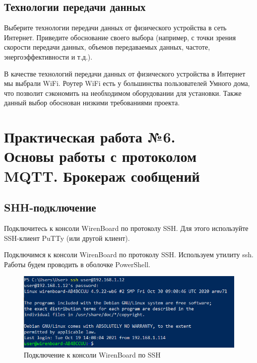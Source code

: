 \documentclass[a4paper,14pt]{extarticle}
\begin{document}
	\subsection{Технологии передачи данных}
	
	\begin{problem}
		Выберите технологии передачи данных от физического устройства в сеть
		Интернет. Приведите обоснование своего выбора (например, с точки зрения скорости
		передачи данных, объемов передаваемых данных, частоте, энергоэффективности и т.д.).
		
		\nonum 
		В качестве технологий передачи данных от физического устройства в Интернет мы выбрали WiFi. Роутер WiFi есть у большинства пользователей Умного дома, что позволит сэкономить на необходимом оборудовании для установки. Также данный выбор обоснован низкими требованиями проекта. 
	\end{problem}
	
	\newpage
\section{Практическая работа №6.\\ Основы работы с протоколом MQTT. Брокераж сообщений }

\subsection{SHH-подключение}

\begin{problem}
	Подключитесь к консоли WirenBoard по протоколу SSH. Для этого используйте SSH-клиент
	PuTTy (или другой клиент).
	
	\nonum 
	
	Подключимся к консоли WirenBoard по протоколу SSH. Используем утилиту ssh. Работы будем проводить в оболочке PowerShell.
	\begin{figure}[h!]
		\centering
		\includegraphics[width=0.9\linewidth]{images/ssh-powershell}
		\caption{Подключение к консоли WirenBoard по SSH}
		\label{fig:ssh-powershell}
	\end{figure}
\end{problem}
\end{document}
